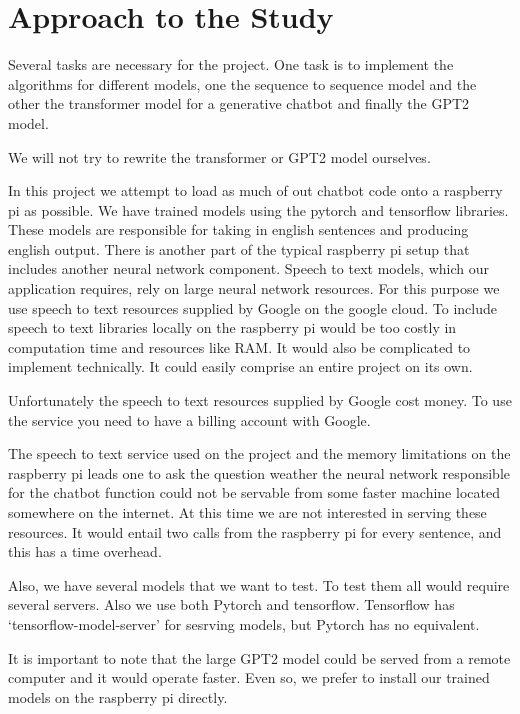 \section{Approach to the Study}

Several tasks are necessary for the project. One task is to implement
the algorithms for different models, one the sequence to sequence model
and the other the transformer model for a generative chatbot and finally the GPT2 model.

We will not try to rewrite the transformer or GPT2 model ourselves.

In this project we attempt to load as much of out chatbot code onto a raspberry pi as possible. We have trained models using the pytorch and tensorflow libraries. These models are responsible for taking in english sentences and producing english output. There is another part of the typical raspberry pi setup that includes another neural network component. Speech to text models, which our application requires, rely on large neural network resources. For this purpose we use speech to text resources supplied by Google on the google cloud. To include speech to text libraries locally on the raspberry pi would be too costly in computation time and resources like RAM. It would also be complicated to implement technically. It could easily comprise an entire project on its own.

Unfortunately the speech to text resources supplied by Google cost money. To use the service you need to have a billing account with Google.

The speech to text service used on the project and the memory limitations on the raspberry pi leads one to ask the question weather the neural network responsible for the chatbot function could not be servable from some faster machine located somewhere on the internet. At this time we are not interested in serving these resources. It would entail two calls from the raspberry pi for every sentence, and this has a time overhead. 

Also, we have several models that we want to test. To test them all would require several servers. Also we use both Pytorch and tensorflow. Tensorflow has `tensorflow-model-server' for sesrving models, but Pytorch has no equivalent.

It is important to note that the large GPT2 model could be served from a remote computer and it would operate faster. Even so, we prefer to install our trained models on the raspberry pi directly.

